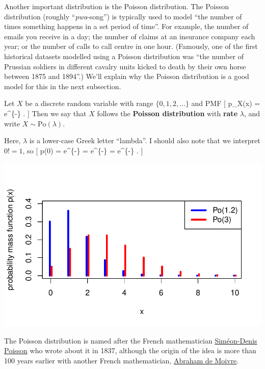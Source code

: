 \documentclass[
  letterpaper,
  DIV=11,
  numbers=noendperiod]{scrreprt}
\theoremstyle{remark}
\begin{document}
Another important distribution is the Poisson distribution. The Poisson
distribution (roughly ``\emph{pwa}-song'') is typically used to model
``the number of times something happens in a set period of time''. For
example, the number of emails you receive in a day; the number of claims
at an insurance company each year; or the number of calls to call centre
in one hour. (Famously, one of the first historical datasets modelled
using a Poisson distribution was ``the number of Prussian soldiers in
different cavalry units kicked to death by their own horse between 1875
and 1894''.) We'll explain why the Poisson distribution is a good model
for this in the next subsection.

Let \(X\) be a discrete random variable with range \(\{0,1,2,\dots\}\)
and PMF {[} p\_X(x) = \mathrm e\^{}\{-\lambda\}  .
{]} Then we say that \(X\) follows the \textbf{Poisson distribution}
with \textbf{rate} \(\lambda\), and write \(X \sim \text{Po}(\lambda)\).

Here, \(\lambda\) is a lower-case Greek letter ``lambda''. I should also
note that we interpret \(0! = 1\), so {[} p(0) =
\mathrm e\^{}\{-\lambda\}  =
\mathrm e\^{}\{-\lambda\}  = \mathrm e\^{}\{-\lambda\} . {]}

\includegraphics{sections/L12-poisson_files/figure-pdf/po-pic-1.pdf}

The Poisson distribution is named after the French mathematician
\href{https://mathshistory.st-andrews.ac.uk/Biographies/Poisson/}{Siméon-Denis
Poisson} who wrote about it in 1837, although the origin of the idea is
more than 100 years earlier with another French mathematician,
\href{https://mathshistory.st-andrews.ac.uk/Biographies/De_Moivre/}{Abraham
de Moivre}.
\end{document}
